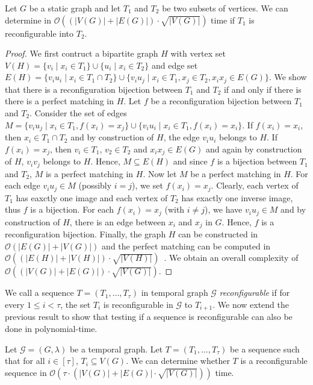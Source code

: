 \begin{lemmarep}
  \label{lemma:check reconfiguration two sets}
Let $G$ be a static graph and let $T_1$ and $T_2$ be two subsets of vertices. We can determine in $\mathcal{O}((|V(G)| + |E(G)|) \cdot \sqrt{|V(G)|})$ time if $T_1$ is reconfigurable into $T_2$.
\end{lemmarep}  
\begin{proof}
  We first contruct a bipartite graph $H$ with vertex set $V(H) = \{v_i \mid x_i \in T_1\} \cup \{u_i \mid x_i \in T_2\}$ and edge set $E(H) = \{v_iu_i \mid x_i \in T_1\cap T_2\} \cup \{v_iu_j \mid x_i \in T_1, x_j\in T_2, x_ix_j \in E(G)\}$.
  We show that there is a reconfiguration bijection between $T_1$ and $T_2$ if and only if there is there is a perfect matching in $H$.
  Let $f$ be a reconfiguration bijection between $T_1$ and $T_2$. Consider the set of edges $M = \{ v_iu_j \mid x_i \in T_1, f(x_i) = x_j\} \cup \{ v_iu_i \mid x_i \in T_1, f(x_i) = x_i\}$. If $f(x_i)=x_i$, then $x_i \in T_1 \cap T_2$ and by construction of $H$, the edge $v_iu_i$ belongs to $H$. If $f(x_i)=x_j$, then $v_i \in T_1$, $v_2 \in T_2$ and $x_ix_j \in E(G)$ and again by construction of $H$, $v_iv_j$ belongs to $H$. Hence, $M \subseteq E(H)$ and since $f$ is a bijection between $T_1$ and $T_2$, $M$ is a perfect matching in $H$.
  Now let $M$ be a perfect matching in $H$. For each edge $v_iu_j \in M$ (possibly $i=j$), we set $f(x_i)=x_j$. Clearly, each vertex of $T_1$ has eaxctly one image and each vertex of $T_2$ has exactly one inverse image, thus $f$ is a bijection. For each $f(x_i)=x_j$ (with $i\neq j$), we have $v_iu_j \in M$ and by construction of $H$, there is an edge between $x_i$ and $x_j$ in $G$. Hence, $f$ is a reconfiguration bijection.
  Finally, the graph $H$ can be constructed in $\mathcal{O}(|E(G)|+|V(G)|)$ and the perfect matching can be computed in $\mathcal{O}((|E(H)|+|V(H)|) \cdot \sqrt{|V(H)|})$~\cite{Hopcroft1971ANA}. We obtain an overall complexity of $\mathcal{O}((|V(G)| + |E(G)|) \cdot \sqrt{|V(G)|})$.
\end{proof}

We call a sequence $T=(T_1,\dots,T_\tau)$ in temporal graph $\mathcal{G}$ \emph{reconfigurable} if for every $1 \leq i  < \tau$, the set $T_i$ is reconfigurable in $\mathcal{G}$ to $T_{i+1}$.  We now extend the previous result to show that testing if a sequence is reconfigurable can also be done in polynomial-time.  


\begin{corollaryrep}
   \label{cor:check reconfiguration sequence}
Let $\mathcal{G}=(G,\lambda)$ be a temporal graph. Let $T=(T_1,\dots,T_\tau)$ be a sequence such that for all $i \in [\tau]$, $T_i \subseteq V(G)$. We can determine whether $T$ is a reconfigurable sequence in $\mathcal{O}(\tau \cdot (|V(G)|+|E(G)|\cdot\sqrt{|V(G)|}))$ time.
\end{corollaryrep}

